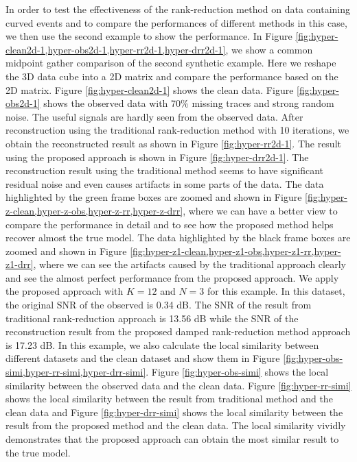 In order to test the effectiveness of the rank-reduction method on data containing curved events and to compare the performances of different methods in this case, we then use the second example to show the performance. In Figure \ref{fig:hyper-clean2d-1,hyper-obs2d-1,hyper-rr2d-1,hyper-drr2d-1}, we show a common midpoint gather comparison of the second synthetic example. Here we reshape the 3D data cube into a 2D matrix and compare the performance based on the 2D matrix. Figure \ref{fig:hyper-clean2d-1} shows the clean data. Figure \ref{fig:hyper-obs2d-1} shows the observed data with 70\% missing traces and strong random noise. The useful signals are hardly seen from the observed data. After reconstruction using the traditional rank-reduction method with 10  iterations, we obtain the reconstructed result as shown in Figure \ref{fig:hyper-rr2d-1}. The result using the proposed approach is shown in Figure \ref{fig:hyper-drr2d-1}. The reconstruction result using the traditional method seems to have significant residual noise and even causes  artifacts in some parts of the data. The data highlighted by the green frame boxes are zoomed and shown in Figure \ref{fig:hyper-z-clean,hyper-z-obs,hyper-z-rr,hyper-z-drr}, where we can have a better view to compare the performance in detail and to see how the proposed method helps recover almost the true model.  The data highlighted by the black frame boxes are zoomed and shown in Figure \ref{fig:hyper-z1-clean,hyper-z1-obs,hyper-z1-rr,hyper-z1-drr}, where we can see the artifacts caused by the traditional approach clearly and see the almost perfect performance from the proposed approach.  We apply the proposed approach with $K=12$ and $N=3$ for this example. In this dataset, the original SNR of the observed is 0.34 dB. The SNR of the result from traditional rank-reduction approach is 13.56 dB while the SNR of the reconstruction result from the proposed damped rank-reduction method approach is 17.23 dB. In this example, we also calculate the local similarity between different datasets and the clean dataset and show them in Figure \ref{fig:hyper-obs-simi,hyper-rr-simi,hyper-drr-simi}. Figure \ref{fig:hyper-obs-simi} shows the local similarity between the observed data and the clean data. Figure \ref{fig:hyper-rr-simi} shows the local similarity between the result from traditional method and the clean data and Figure \ref{fig:hyper-drr-simi} shows the local similarity between the result from the proposed method and the clean data. The local similarity vividly demonstrates that the proposed approach can obtain the most similar result to the true model. 


